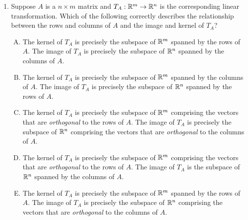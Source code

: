 \documentclass[10pt]{amsart}
\begin{document}
\begin{enumerate}
  {\em Answer}: Option (B)

  {\em Explanation}: We know the kernel of a composite contains the
  kernel of the very first operation, so the dimension is at least
  $n$. But it could be bigger. Recall that the dimensions of the
  kernels could at worst add up, so the worst case scenario (which
  occurs if each time the kernel is also contained in the image) is
  that the total dimension is $nr$.

  {\em Performance review}: 16 out of 27 got this. 9 chose (A), 1
  chose (C), 1 left the question blank.
 
  {\em Historical note (last time)}: $13$ out of $26$ got this. $7$ chose (A),
  $5$ chose (C), $1$ chose (D).

  \vspace{0.4in}

  The next few questions deal with the relationship between the rows
  and columns of the matrix on the one hand, and the image and kernel
  of the linear transformation on the other hand.

\item Suppose $A$ is a $n \times m$ matrix and $T_A: \mathbb{R}^m \to \mathbb{R}^n$ is
  the corresponding linear transformation. Which of the following
  correctly describes the relationship between the rows and columns of
  $A$ and the image and kernel of $T_A$?

  \begin{enumerate}[(A)]
  \item The kernel of $T_A$ is precisely the subspace of $\mathbb{R}^m$
    spanned by the rows of $A$. The image of $T_A$ is precisely the
    subspace of $\mathbb{R}^n$ spanned by the columns of $A$.
  \item The kernel of $T_A$ is precisely the subspace of $\mathbb{R}^m$
    spanned by the columns of $A$. The image of $T_A$ is precisely the
    subspace of $\mathbb{R}^n$ spanned by the rows of $A$.
  \item The kernel of $T_A$ is precisely the subspace of $\mathbb{R}^m$
    comprising the vectors that are {\em orthogonal} to the rows of
    $A$. The image of $T_A$ is precisely the subspace of $\mathbb{R}^n$
    comprising the vectors that are {\em orthogonal} to the columns of
    $A$.
  \item The kernel of $T_A$ is precisely the subspace of $\mathbb{R}^m$
    comprising the vectors that are {\em orthogonal} to the rows of
    $A$. The image of $T_A$ is the subspace of $\mathbb{R}^n$ spanned by the
    columns of $A$.
  \item The kernel of $T_A$ is precisely the subspace of $\mathbb{R}^m$
    spanned by the rows of $A$. The image of $T_A$ is precisely the
    subspace of $\mathbb{R}^n$ comprising the vectors that are {\em
      orthogonal} to the columns of $A$.
  \end{enumerate}


\end{enumerate}
\end{document}
